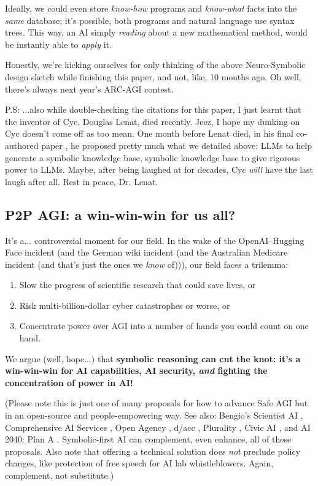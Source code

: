 \documentclass[11pt]{article}
\begin{document}
Ideally, we could even store \textit{know-how} programs and \textit{know-what} facts into the \textit{same} database; it's possible, both programs and natural language use syntax trees. This way, an AI simply \textit{reading} about a new mathematical method, would be instantly able to \textit{apply} it.

Honestly, we're kicking ourselves for only thinking of the above Neuro-Symbolic design sketch while finishing this paper, and not, like, 10 months ago. Oh well, there's always next year's ARC-AGI contest.

P.S: ...also while double-checking the citations for this paper, I just learnt that the inventor of Cyc, Douglas Lenat, died recently. Jeez, I hope my dunking on Cyc doesn't come off as too mean. One month before Lenat died, in his final co-authored paper \citep{lenat_marcus}, he proposed pretty much what we detailed above: LLMs to help generate a symbolic knowledge base, symbolic knowledge base to give rigorous power to LLMs. Maybe, after being laughed at for decades, Cyc \textit{will} have the last laugh after all. Rest in peace, Dr. Lenat.

\subsection{P2P AGI: a win-win-win for us all?}

It's a... controversial moment for our field. In the wake of the OpenAI–Hugging Face incident (and the German wiki incident (and the Australian Medicare incident (and that's just the ones we \textit{know} of))), our field faces a trilemma:

\begin{enumerate}
    \item Slow the progress of scientific research that could save lives, or
    \item Risk multi-billion-dollar cyber catastrophes or worse, or
    \item Concentrate power over AGI into a number of hands you could count on one hand.
\end{enumerate}

We argue (well, hope...) that \textbf{symbolic reasoning can cut the knot: it's a win-win-win for AI capabilities, AI security, \textit{and} fighting the concentration of power in AI!}

(Please note this is just one of many proposals for how to advance Safe AGI but in an open-source and people-empowering way. See also: Bengio’s Scientist AI \citep{bengio_scientist_ai}, Comprehensive AI Services \citep{drexler_cais}, Open Agency \citep{drexler_open_agency}, d/acc \citep{buterin_dacc}, Plurality \citep{plurality}, Civic AI \citep{civic_ai}, and AI 2040: Plan A \citep{ai_2040_plan_a}. Symbolic-first AI can complement, even enhance, all of these proposals. Also note that offering a technical solution does \textit{not} preclude policy changes, like protection of free speech for AI lab whistleblowers. Again, complement, not substitute.)
\end{document}
